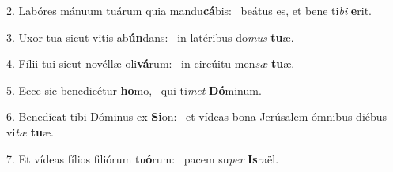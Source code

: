 2. Labóres mánuum tuárum quia mandu\textbf{cá}bis: \ast\  beátus es, et bene ti\textit{bi} \textbf{e}rit.\

3. Uxor tua sicut vitis ab\textbf{ún}dans: \ast\  in latéribus do\textit{mus} \textbf{tu}æ.\

4. Fílii tui sicut novéllæ oli\textbf{vá}rum: \ast\  in circúitu men\textit{sæ} \textbf{tu}æ.\

5. Ecce sic benedicétur \textbf{ho}mo, \ast\  qui ti\textit{met} \textbf{Dó}minum.\

6. Benedícat tibi Dóminus ex \textbf{Si}on: \ast\  et vídeas bona Jerúsalem ómnibus diébus vi\textit{tæ} \textbf{tu}æ.\

7. Et vídeas fílios filiórum tu\textbf{ó}rum: \ast\  pacem su\textit{per} \textbf{Is}raël.\

